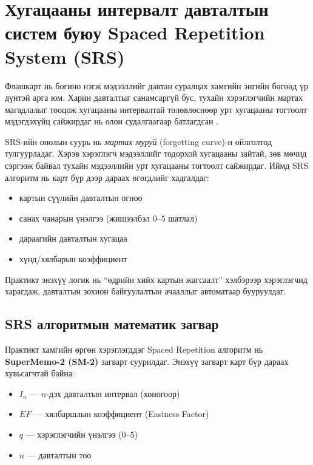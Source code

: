 \section{Хугацааны интервалт давталтын систем буюу Spaced Repetition System (SRS)}

Флашкарт нь богино нэгж мэдээллийг давтан суралцах хамгийн энгийн бөгөөд үр дүнтэй арга юм. Харин давталтыг санамсаргүй бус, тухайн хэрэглэгчийн мартах магадлалыг тооцож хугацааны интервалтай төлөвлөснөөр урт хугацааны тогтоолт мэдэгдэхүйц сайжирдаг нь олон судалгаагаар батлагдсан \cite{Cepeda2006}.

SRS-ийн онолын суурь нь \textit{мартах муруй} (forgetting curve)-н ойлголтод тулгуурладаг. Хэрэв хэрэглэгч мэдээллийг тодорхой хугацааны зайтай, зөв мөчид сэргээж байвал тухайн мэдээллийн урт хугацааны тогтоолт сайжирдаг. Иймд SRS алгоритм нь карт бүр дээр дараах өгөгдлийг хадгалдаг:

\begin{itemize}[leftmargin=2em, itemsep=0.2em]
    \item картын сүүлийн давталтын огноо
    \item санах чанарын үнэлгээ (жишээлбэл $0$--$5$ шатлал)
    \item дараагийн давталтын хугацаа
    \item хүнд/хялбарын коэффициент
\end{itemize}

Практикт энэхүү логик нь ``өдрийн хийх картын жагсаалт'' хэлбэрээр хэрэглэгчид харагдаж, давталтын зохион байгуулалтын ачааллыг автоматаар бууруулдаг.

\subsection{SRS алгоритмын математик загвар}

Практикт хамгийн өргөн хэрэглэгддэг Spaced Repetition алгоритм нь \textbf{SuperMemo-2 (SM-2)} загварт суурилдаг. Энэхүү загварт карт бүр дараах хувьсагчтай байна:

\begin{itemize}[leftmargin=2em, itemsep=0.2em]
    \item $I_n$ — $n$-дэх давталтын интервал (хоногоор)
    \item $EF$ — хялбаршлын коэффициент (Easiness Factor)
    \item $q$ — хэрэглэгчийн үнэлгээ ($0$--$5$)
    \item $n$ — давталтын тоо
\end{itemize}

